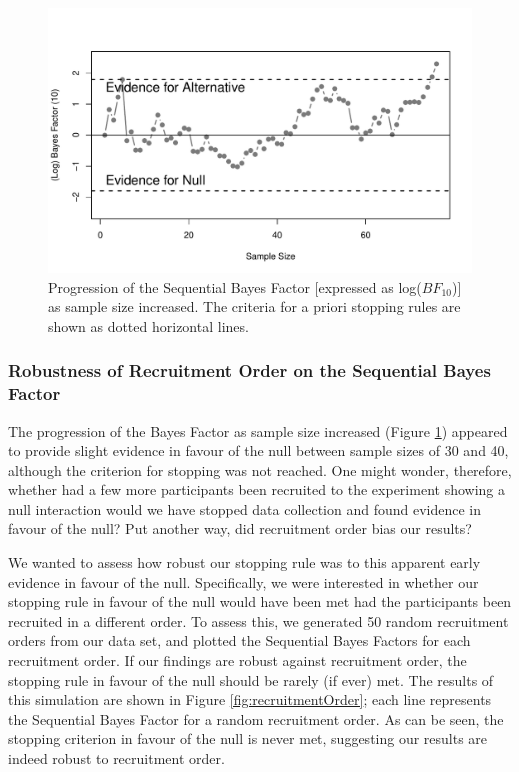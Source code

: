 \documentclass[a4paper, man, natbib]{apa6}
\begin{document}
\begin{figure}
\begin{center}
\includegraphics[width = \textwidth]{Images/bayesFactor.pdf}
\caption{Progression of the Sequential Bayes Factor [expressed as log($BF_{10}$)] as sample size increased. The criteria for a priori stopping rules are shown as dotted horizontal lines.}
\label{fig:bayesFactor}
\end{center}
\end{figure}

\subsubsection{Robustness of Recruitment Order on the Sequential Bayes Factor}
The progression of the Bayes Factor as sample size increased (Figure \ref{fig:bayesFactor}) appeared to provide slight evidence in favour of the null between sample sizes of 30 and 40, although the criterion for stopping was not reached. One might wonder, therefore, whether had a few more participants been recruited to the experiment showing a null interaction would we have stopped data collection and found evidence in favour of the null? Put another way, did recruitment order bias our results?

We wanted to assess how robust our stopping rule was to this apparent early evidence in favour of the null. Specifically, we were interested in whether our stopping rule in favour of the null would have been met had the participants been recruited in a different order. To assess this, we generated 50 random recruitment orders from our data set, and plotted the Sequential Bayes Factors for each recruitment order. If our findings are robust against recruitment order, the stopping rule in favour of the null should be rarely (if ever) met.  The results of this simulation are shown in Figure \ref{fig:recruitmentOrder}; each line represents the Sequential Bayes Factor for a random recruitment order. As can be seen, the stopping criterion in favour of the null is never met, suggesting our results are indeed robust to recruitment order. 
\end{document}
